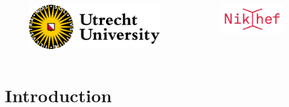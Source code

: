 \documentclass[usenames,dvipsnames,t]{beamer}
\begin{document}
{\begin{frame}
  \begin{columns}
  \begin{figure}
    \centering
    \vspace{1.5mm}
    \includegraphics[width=0.75\linewidth]{Figures/utrecht-university.png}
  \end{figure}
  \begin{figure}
    \centering
    \includegraphics[width=0.75\linewidth]{Figures/Nikhef_logo-transparent.png}
  \end{figure}
\end{columns}
  
  \end{frame}
}




\section{Introduction}
\end{document}
